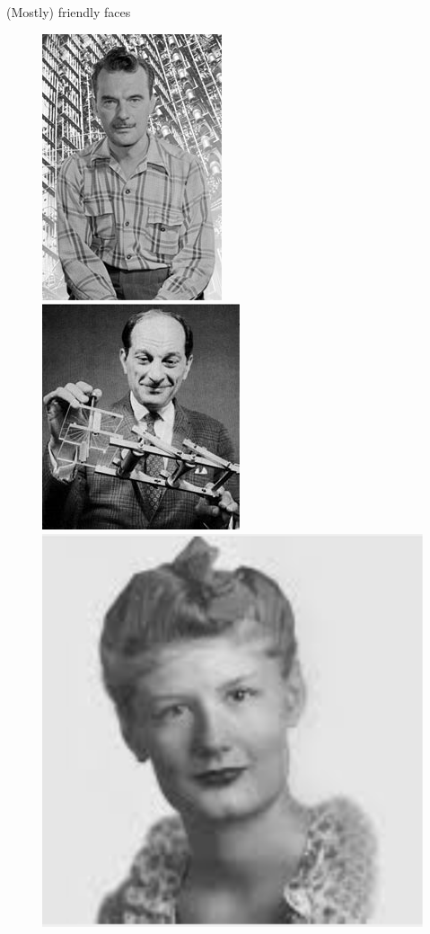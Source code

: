 \documentclass[10pt]{beamer}
\begin{document}
\begin{frame}{(Mostly) friendly faces}
\begin{figure}
  \includegraphics[height=.3\textheight]{Figures/metropolis}
  \includegraphics[height=.3\textheight]{Figures/ulam}\\
  \includegraphics[height=.3\textheight]{Figures/rosenbluth}

\end{figure}
\end{frame}
\end{document}

